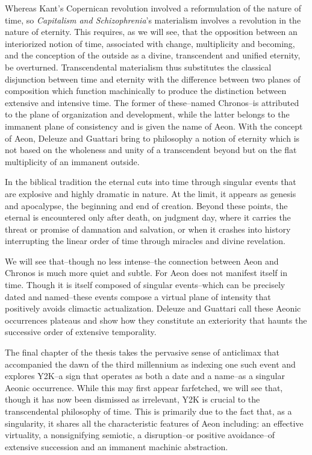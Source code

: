 Whereas Kant's Copernican revolution involved a reformulation of the nature of time, so \textit{Capitalism and Schizophrenia}'s materialism involves a revolution in the nature of eternity. This requires, as we will see, that the opposition between an interiorized notion of time, associated with change, multiplicity and becoming, and the conception of the outside as a divine, transcendent and unified eternity, be overturned. Transcendental materialism thus substitutes the classical disjunction between time and eternity with the difference between two planes of composition which function machinically to produce the distinction between extensive and intensive time. The former of these--named Chronos--is attributed to the plane of organization and development, while the latter belongs to the immanent plane of consistency and is given the name of Aeon. With the concept of Aeon, Deleuze and Guattari bring to philosophy a notion of eternity which is not based on the wholeness and unity of a transcendent beyond but on the flat multiplicity of an immanent outside.

In the biblical tradition the eternal cuts into time through singular events that are explosive and highly dramatic in nature. At the limit, it appears as genesis and apocalypse, the beginning and end of creation. Beyond these points, the eternal is encountered only after death, on judgment day, where it carries the threat or promise of damnation and salvation, or when it crashes into history interrupting the linear order of time through miracles and divine revelation. 

We will see that--though no less intense--the connection between Aeon and Chronos is much more quiet and subtle. For Aeon does not manifest itself in time. Though it is itself composed of singular events--which can be precisely dated and named--these events compose a virtual plane of intensity that positively avoids climactic actualization. Deleuze and Guattari call these Aeonic occurrences plateaus and show how they constitute an exteriority that haunts the successive order of extensive temporality.

The final chapter of the thesis takes the pervasive sense of anticlimax that accompanied the dawn of the third millennium as indexing one such event and explores Y2K--a sign that operates as both a date and a name--as a singular Aeonic occurrence. While this may first appear farfetched, we will see that, though it has now been dismissed as irrelevant, Y2K is crucial to the transcendental philosophy of time. This is primarily due to the fact that, as a singularity, it shares all the characteristic features of Aeon including: an effective virtuality, a nonsignifying semiotic, a disruption--or positive avoidance--of extensive succession and an immanent machinic abstraction.

